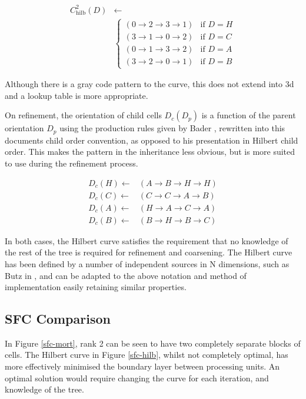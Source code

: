 \documentclass[12pt]{article}
\begin{document}
\begin{align}
	C_{\mathrm{hilb}}^2\left(D\right) &\gets \\
	& \begin{cases}
		\left( 0 \to 2 \to 3 \to 1\right) & \text{if }D=H \\
		\left( 3 \to 1 \to 0 \to 2\right) & \text{if }D=C \\
		\left( 0 \to 1 \to 3 \to 2\right) & \text{if }D=A \\
		\left( 3 \to 2 \to 0 \to 1\right) & \text{if }D=B
		\end{cases} \nonumber
\end{align}

Although there is a gray code pattern to the curve, this does not extend into 3d and a lookup table is more appropriate.

On refinement, the orientation of child cells $D_c(D_p)$ is a function of the parent orientation $D_p$ using the production rules given by Bader \cite{bader2013}, rewritten into this documents child order convention, as opposed to his presentation in Hilbert child order. This makes the pattern in the inheritance less obvious, but is more suited to use during the refinement process.

\begin{align}
	D_c(H) \gets& \left( A \to B \to H \to H \right) \\
	D_c(C) \gets& \left( C \to C \to A \to B \right) \\
	D_c(A) \gets& \left( H \to A \to C \to A \right) \\
	D_c(B) \gets& \left( B \to H \to B \to C \right)
\end{align}


In both cases, the Hilbert curve satisfies the requirement that no knowledge of the rest of the tree is required for refinement and coarsening. The Hilbert curve has been defined by a number of independent sources in N dimensions, such as Butz in \cite{butz71}, and can be adapted to the above notation and method of implementation easily retaining similar properties. 

\subsection{SFC Comparison}

In Figure \ref{sfc-mort}, rank 2 can be seen to have two completely separate blocks of cells. The Hilbert curve in Figure \ref{sfc-hilb}, whilst not completely optimal, has more effectively minimised the boundary layer between processing units. An optimal solution would require changing the curve for each iteration, and knowledge of the tree. 
\end{document}
